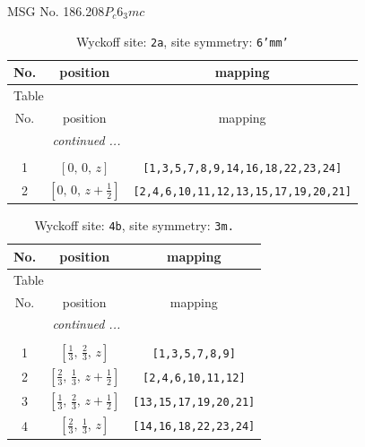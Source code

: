 \documentclass[fleqn,8pt]{jsarticle}
\begin{document}
\setcounter{MaxMatrixCols}{32}

\renewcommand{\tablename}{Table~}
\renewcommand{\figurename}{Figure~}
\begin{center}
\LARGE
MSG No. 186.208\quad$P_{c}6_{3}mc$
\end{center}
\renewcommand{\arraystretch}{1.2}
\begin{longtable}{ccc}
\caption{Wyckoff site: {\tt 2a}, site symmetry: {\tt 6'mm'}}
 \\
 \hline \hline
No. & position & mapping \\ \hline \endfirsthead

\multicolumn{2}{l}{\tablename\ \thetable{}} \\
 \hline \hline
No. & position & mapping \\ \hline \endhead

 \hline \hline
\multicolumn{2}{r}{\footnotesize\it continued ...} \\ \endfoot

 \hline \hline
\multicolumn{2}{r}{} \\ \endlastfoot

1 & $\left[ 0,\, 0,\, z \right]$ & {\tt [1,3,5,7,8,9,14,16,18,22,23,24]} \\ \hline
2 & $\left[ 0,\, 0,\, z + \frac{1}{2} \right]$ & {\tt [2,4,6,10,11,12,13,15,17,19,20,21]} \\
\end{longtable}
\renewcommand{\arraystretch}{1.2}
\begin{longtable}{ccc}
\caption{Wyckoff site: {\tt 4b}, site symmetry: {\tt 3m.}}
 \\
 \hline \hline
No. & position & mapping \\ \hline \endfirsthead

\multicolumn{2}{l}{\tablename\ \thetable{}} \\
 \hline \hline
No. & position & mapping \\ \hline \endhead

 \hline \hline
\multicolumn{2}{r}{\footnotesize\it continued ...} \\ \endfoot

 \hline \hline
\multicolumn{2}{r}{} \\ \endlastfoot

1 & $\left[ \frac{1}{3},\, \frac{2}{3},\, z \right]$ & {\tt [1,3,5,7,8,9]} \\ \hline
2 & $\left[ \frac{2}{3},\, \frac{1}{3},\, z + \frac{1}{2} \right]$ & {\tt [2,4,6,10,11,12]} \\ \hline
3 & $\left[ \frac{1}{3},\, \frac{2}{3},\, z + \frac{1}{2} \right]$ & {\tt [13,15,17,19,20,21]} \\ \hline
4 & $\left[ \frac{2}{3},\, \frac{1}{3},\, z \right]$ & {\tt [14,16,18,22,23,24]} \\
\end{longtable}
\end{document}
